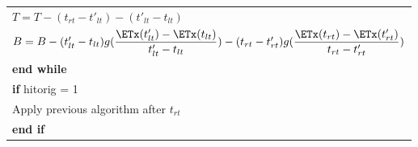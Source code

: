 \begin{table}
\begin{minipage}[b]{8cm}
\begin{tabular}{p{7cm}}
\\
\hspace{4mm} $T = T - (t_{rt}-t'_{lt}) - (t'_{lt} - t_{lt})$
\\
\hspace{4mm}$B = B -  (t'_{lt}-t_{lt})g(\dfrac{\ETx(t'_{lt})-\ETx(t_{lt})}{t'_{lt}-t_{lt}}) - (t_{rt}-t'_{rt})g(\dfrac{\ETx(t_{rt})-\ETx(t'_{rt})}{t_{rt}-t'_{rt}})$
\\
\textbf{end while}
\\
\textbf{if} hitorig = 1
\\
\hspace{4mm}
Apply previous algorithm after $t_{rt}$
\\
\textbf{end if}
\end{tabular}
\end{minipage}
\end{table}


